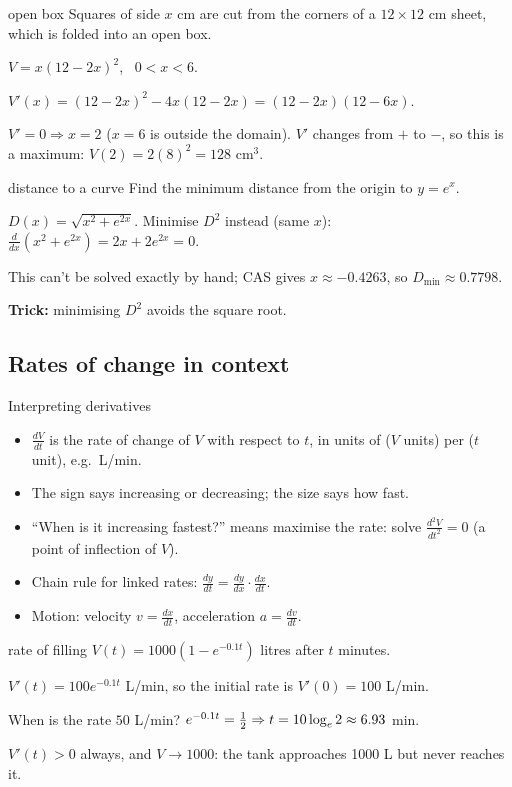 \begin{cols}
\begin{example}{open box \byhand}
Squares of side $x$ cm are cut from the corners of a $12\times12$ cm sheet, which is folded into an open box.\par
$V=x(12-2x)^2$, \ $0<x<6$.\par
$V'(x)=(12-2x)^2-4x(12-2x)=(12-2x)(12-6x)$.\par
$V'=0\Rightarrow x=2$ ($x=6$ is outside the domain). $V'$ changes from $+$ to $-$, so this is a maximum: $V(2)=2(8)^2=128$ cm$^3$.
\end{example}
\nextcol
\begin{example}{distance to a curve \examtwo}
Find the minimum distance from the origin to $y=e^x$.\par
$D(x)=\sqrt{x^2+e^{2x}}$. Minimise $D^2$ instead (same $x$): $\frac{d}{dx}(x^2+e^{2x})=2x+2e^{2x}=0$.\par
This can't be solved exactly by hand; CAS gives $x\approx-0.4263$, so $D_{\min}\approx0.7798$.\par
\textbf{Trick:} minimising $D^2$ avoids the square root.
\end{example}
\end{cols}

\subsection{Rates of change in context}
\label{sec:rates}

\begin{cols}
\begin{keyres}{Interpreting derivatives}
\begin{itemize}
  \item $\frac{dV}{dt}$ is the rate of change of $V$ with respect to $t$, in units of ($V$ units) per ($t$ unit), e.g.\ L/min.
  \item The sign says increasing or decreasing; the size says how fast.
  \item ``When is it increasing fastest?'' means maximise the rate: solve $\frac{d^2V}{dt^2}=0$ (a point of inflection of $V$).
  \item Chain rule for linked rates: $\frac{dy}{dt}=\frac{dy}{dx}\cdot\frac{dx}{dt}$.
  \item Motion: velocity $v=\frac{dx}{dt}$, acceleration $a=\frac{dv}{dt}$.
\end{itemize}
\end{keyres}
\nextcol
\begin{example}{rate of filling}
$V(t)=1000\left(1-e^{-0.1t}\right)$ litres after $t$ minutes.\par
$V'(t)=100e^{-0.1t}$ L/min, so the initial rate is $V'(0)=100$ L/min.\par
When is the rate $50$ L/min? $e^{-0.1t}=\frac12\Rightarrow t=10\log_e2\approx6.93$ min.\par
$V'(t)>0$ always, and $V\to1000$: the tank approaches 1000 L but never reaches it.
\end{example}
\end{cols}

